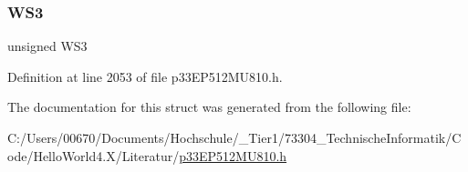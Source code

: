 \subsubsection{\texorpdfstring{W\+S3}{WS3}}
{\footnotesize\ttfamily unsigned W\+S3}



Definition at line 2053 of file p33\+E\+P512\+M\+U810.\+h.



The documentation for this struct was generated from the following file\+:\begin{DoxyCompactItemize}
\item 
C\+:/\+Users/00670/\+Documents/\+Hochschule/\+\_\+\+Tier1/73304\+\_\+\+Technische\+Informatik/\+Code/\+Hello\+World4.\+X/\+Literatur/\hyperlink{p33_e_p512_m_u810_8h}{p33\+E\+P512\+M\+U810.\+h}\end{DoxyCompactItemize}
